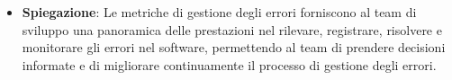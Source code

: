 \begin{itemize}
\begin{itemize}
    \end{itemize}
    \item \textbf{Spiegazione}: Le metriche di gestione degli errori forniscono al team di sviluppo una panoramica delle prestazioni nel rilevare, registrare, risolvere e monitorare gli errori nel software, permettendo al team di prendere decisioni informate e di migliorare continuamente il processo di gestione degli errori.
\end{itemize}

